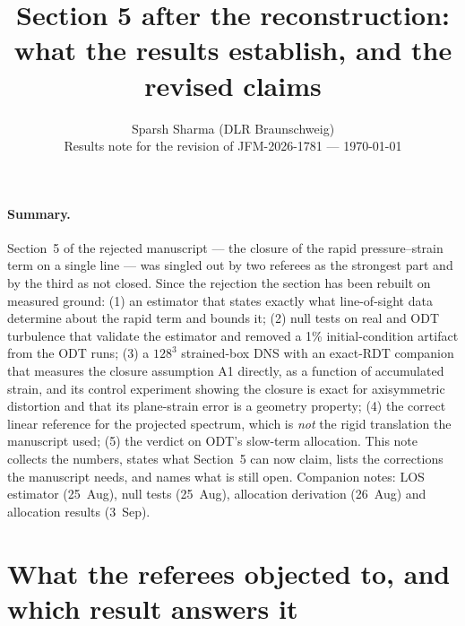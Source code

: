 \documentclass[11pt,a4paper]{article}
\title{\vspace{-1.2em}Section 5 after the reconstruction:\\
what the results establish, and the revised claims}
\author{Sparsh Sharma (DLR Braunschweig)\\[0.2em]
\normalsize Results note for the revision of JFM-2026-1781 --- \today}
\date{}
\begin{document}
\maketitle
\vspace{-2em}

\paragraph{Summary.} Section~5 of the rejected manuscript --- the closure
of the rapid pressure--strain term on a single line --- was singled out by
two referees as the strongest part and by the third as not closed. Since
the rejection the section has been rebuilt on measured ground: (1) an
estimator that states exactly what line-of-sight data determine about the
rapid term and bounds it; (2) null tests on real and ODT turbulence that
validate the estimator and removed a 1\% initial-condition artifact from
the ODT runs; (3) a $128^3$ strained-box DNS with an exact-RDT companion
that measures the closure assumption A1 directly, as a function of
accumulated strain, and its control experiment showing the closure is
exact for axisymmetric distortion and that its plane-strain error is a
geometry property; (4) the correct linear reference for the projected
spectrum, which is \emph{not} the rigid translation the manuscript used;
(5) the verdict on ODT's slow-term allocation. This note collects the
numbers, states what Section~5 can now claim, lists the corrections the
manuscript needs, and names what is still open. Companion notes: LOS
estimator (25~Aug), null tests (25~Aug), allocation derivation (26~Aug)
and allocation results (3~Sep).

\section{What the referees objected to, and which result answers it}
\end{document}
